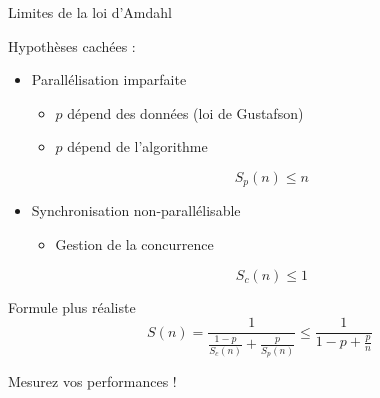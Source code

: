 
\begingroup

\begin{frame}{Limites de la loi d'Amdahl}
  \begin{block}{Hypothèses cachées :}
    \begin{itemize}
    \item Parallélisation imparfaite
    \begin{itemize}
    \item $p$ dépend des données (loi de Gustafson)
    \item $p$ dépend de l'algorithme
    \end{itemize}
    $$S_p(n) \le n$$
  \item Synchronisation non-parallélisable
    \begin{itemize}
    \item Gestion de la concurrence
    \end{itemize}
    $$S_c(n) \le 1$$
    \end{itemize}
  \end{block}
  \begin{block}{Formule plus réaliste}
    $$
    S(n) = \frac{1}{\frac{1-p}{S_c(n)} + \frac{p}{S_p(n)}} \le \frac{1}{1-p + \frac{p}{n}}
    $$
    \begin{center}
      \alert{Mesurez vos performances !}
    \end{center}
  \end{block}
\end{frame}

\endgroup
\endinput
